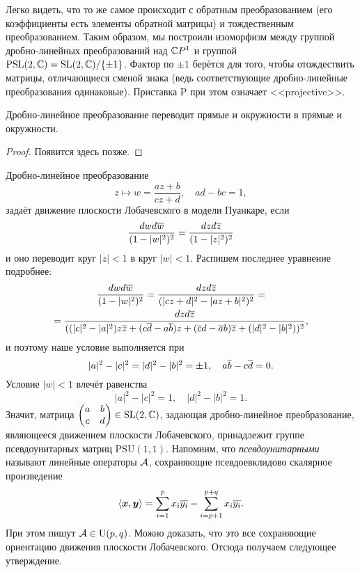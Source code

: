 Легко видеть, что то же самое происходит с обратным преобразованием (его коэффициенты есть элементы обратной матрицы) и тождественным преобразованием. Таким образом, мы построили изоморфизм между группой дробно-линейных преобразований над $\mathbb{C} P^1$ и группой $\mathrm{PSL}(2, \mathbb{C}) = \mathrm{SL}(2, \mathbb{C}) / \{\pm 1\}$. Фактор по $\pm 1$ берётся для того, чтобы отождествить матрицы, отличающиеся сменой знака (ведь соответствующие дробно-линейные преобразования одинаковые). Приставка $\mathrm{P}$ при этом означает <<projective>>.

\begin{proposition}
	Дробно-линейное преобразование переводит прямые и окружности в прямые и окружности.
\end{proposition}

\begin{proof}
	Появится здесь позже.
\end{proof}

\noindent
Дробно-линейное преобразование
\[
	z \mapsto w = \frac{az + b}{cz + d},\quad ad - bc = 1,
\]
задаёт движение плоскости Лобачевского в модели Пуанкаре, если
\[
	\frac{dwd\overline{w}}{(1 - |w|^2)^2} = \frac{dzd\overline{z}}{(1 - |z|^2)^2}
\]
и оно переводит круг $|z| < 1$ в круг $|w| < 1$. Распишем последнее уравнение подробнее:
\begin{multline*}
	\frac{dwd\overline{w}}{(1 - |w|^2)^2} = \frac{dzd\overline{z}}{(|cz + d|^2 - |az + b|^2)^2} =\\ = \frac{dzd\overline{z}}{((|c|^2 - |a|^2)z\overline{z} + (c\overline{d} - a\overline{b})z + (\overline{c}d - \overline{a}b)\overline{z} + (|d|^2 - |b|^2))^2},
\end{multline*}
и поэтому наше условие выполняется при
\[
	|a|^2 - |c|^2 = |d|^2 - |b|^2 = \pm 1,\quad a\overline{b} - c\overline{d} = 0.
\]
Условие $|w| < 1$ влечёт равенства
\[
	|a|^2 - |c|^2 = 1,\quad |d|^2 - |b|^2 = 1.
\]
Значит, матрица
$\begin{pmatrix}
	a & b\\
	c & d
\end{pmatrix} \in \mathrm{SL}(2, \mathbb{C})$, задающая дробно-линейное преобразование, являющееся движением плоскости Лобачевского, принадлежит группе псевдоунитарных матриц $\mathrm{PSU}(1, 1)$. Напомним, что \textit{псевдоунитарными} называют линейные операторы $\mathcal{A}$, сохраняющие псевдоевклидово скалярное произведение
\[
	\langle\boldsymbol{x}, \boldsymbol{y}\rangle = \sum_{i = 1}^px_i\overline{y_i} - \sum_{i = p + 1}^{p + q}x_i\overline{y_i}.
\]
При этом пишут $\mathcal{A} \in \mathrm{U}(p, q)$. Можно доказать, что это все сохраняющие ориентацию движения плоскости Лобачевского. Отсюда получаем следующее утверждение.

